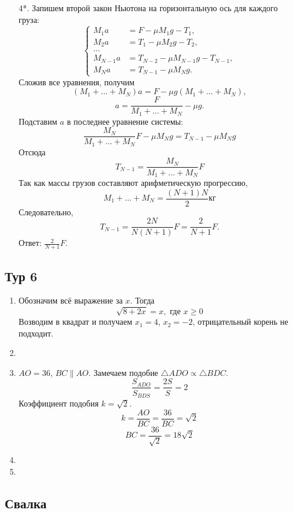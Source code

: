 \documentclass[12pt]{article} %
\begin{document}
\begin{enumerate}
\item[4*.]
    Запишем второй закон Ньютона на горизонтальную ось для каждого груза:
    \[
        \begin{cases}
            M_1 a &= F   - \mu M_1 g - T_1, \\
            M_2 a &= T_1 - \mu M_2 g - T_2,\\
            \ldots \\ %
            M_{N-1} a &= T_{N-2} - \mu M_{N-1} g - T_{N-1},\\
            M_{N}   a &= T_{N-1} - \mu M_{N} g.
        \end{cases}
    \]
    Сложив все уравнения, получим
    \[
        (M_1 + \ldots + M_N) a = F - \mu g (M_1 + \ldots + M_N),
    \]
    \[
        a = \frac{F}{M_1 + \ldots + M_N} - \mu g.
    \]
    Подставим $a$ в последнее уравнение системы:
    \[
        \frac{M_N}{M_1 + \ldots + M_N}F - \mu M_N g = T_{N-1} - \mu M_N g
    \]
    Отсюда 
    \[
        T_{N-1} = \frac{M_N}{M_1 + \ldots + M_N}F
    \]
    Так как массы грузов составляют арифметическую прогрессию,
    \[
        M_1 + \ldots + M_N = \frac{(N+1)N}{2} \text{кг}
    \]
    Следовательно,
    \[
        T_{N-1} = \frac{2N}{N(N+1)} F = \frac{2}{N+1} F.
    \]
    Ответ: $\frac{2}{N+1} F$.
    
\end{enumerate}

\subsection*{Тур 6}

\begin{enumerate}
\item Обозначим всё выражение за $x$. Тогда
\[
\sqrt{8 + 2x} = x, \text{ где } x\geq 0     
\]
Возводим в квадрат и получаем $x_1 = 4$, $x_2 = -2$, отрицательный корень не подходит. 
\item 
\item $AO=36$, $BC\parallel AO$. Замечаем подобие $\triangle ADO \propto \triangle BDC$. 
\[
\frac{S_{ADO}}{S_{BDS}} = \frac{2S}{S} = 2    
\]
Коэффициент подобия $k = \sqrt{2}$. 
\[
k = \frac{AO}{BC} = \frac{36}{BC} = \sqrt{2}    
\]
\[
BC = \frac{36}{\sqrt{2}} = 18 \sqrt{2}    
\]
\item 
\item 
\end{enumerate}


\subsection*{Свалка}
\end{document}
